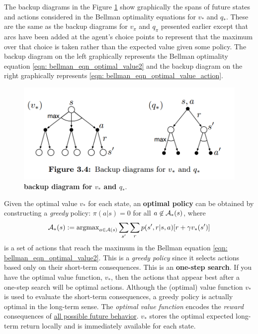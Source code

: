 \documentclass[11pt]{article}
\begin{document}
The backup diagrams in the Figure \ref{fig: backup_diagram_bellman_opt} show graphically the spans of future states and actions considered in the Bellman optimality equations for $v_{*}$ and $q_{*}$. These are the same as the backup diagrams for $v_{\pi}$ and $q_{\pi}$ presented earlier except that arcs have been added at the agent’s choice points to represent that the maximum over that choice is taken rather than the expected value given some policy. The backup diagram on the left graphically represents the Bellman optimality equation \eqref{eqn: bellman_eqn_optimal_value2} and the backup diagram on the right graphically represents \eqref{eqn: bellman_eqn_optimal_value_action}.

\begin{figure}
\begin{minipage}[t]{1\linewidth}
  \centering
  \centerline{\includegraphics[scale = 0.3]{Bellman_eqn_opt.png}}
\end{minipage}
\caption{\footnotesize{\textbf{backup diagram for $v_{*}$ and $q_{*}$}.  \citep{sutton2018reinforcement}}}
\label{fig: backup_diagram_bellman_opt}
\end{figure}

Given the optimal value $v_{*}$ for each state, an \textbf{optimal policy} can be obtained by constructing a \emph{greedy} policy: $\pi(a|s) = 0$ for all $a \not\in {\mathcal A}_{*}(s)$, where $${\mathcal A}_{*}(s):=\operatorname{argmax}_{a\in {\mathcal A}(s)}\sum_{s'}\sum_{r}p(s', r|s, a)[r + \gamma v_{*}(s')]$$ is a set of actions that reach the maximum in the Bellman equation \eqref{eqn: bellman_eqn_optimal_value2}. This is a \emph{greedy policy} since it selects actions based only on their short-term consequences. This is an \textbf{one-step search}. If you have the optimal value function, $v_{*}$, then the actions that appear best after a one-step search will be optimal actions.  Although the (optimal) value function $v_{*}$ is used to evaluate the short-term consequences, a greedy policy is actually optimal in the long-term sense. The \emph{optimal value function} encodes the \emph{reward} consequences of \underline{all possible future behavior}. $v_{*}$ stores the optimal expected long-term return locally and is immediately available for each state. 
\end{document}
